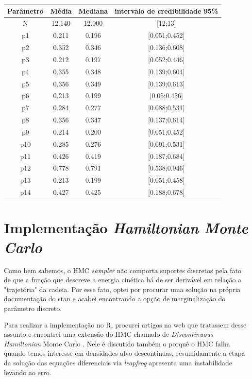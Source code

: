 \documentclass[a4paper,12pt,twoside]{article}
\begin{document}
\begin{table}[ht]
\centering
\begin{tabular}{cccc}
  \hline
  Parâmetro & Média & Mediana & intervalo de credibilidade 95\% \\ 
  \hline
 N & 12.140 & 12.000 & [12;13] \\ 
p1 & 0.211 & 0.196 & [0.051;0.452] \\ 
p2 & 0.352 & 0.346 & [0.136;0.608] \\ 
p3 & 0.212 & 0.197 & [0.052;0.446] \\ 
 p4 & 0.355 & 0.348 & [0.139;0.604] \\ 
 p5 & 0.356 & 0.349 & [0.139;0.613] \\ 
 p6 & 0.213 & 0.199 & [0.05;0.456] \\ 
 p7 & 0.284 & 0.277 & [0.088;0.531] \\ 
 p8 & 0.356 & 0.347 & [0.137;0.614] \\ 
 p9 & 0.214 & 0.200 & [0.051;0.452] \\ 
p10 & 0.285 & 0.276 & [0.091;0.531] \\ 
 p11 & 0.426 & 0.419 & [0.187;0.684] \\ 
 p12 & 0.778 & 0.791 & [0.538;0.946] \\ 
p13 & 0.213 & 0.199 & [0.051;0.458] \\ 
 p14 & 0.427 & 0.425 & [0.188;0.678] \\ 
   \hline
\end{tabular}
\end{table}

\newpage
\section{Implementação \textit{Hamiltonian Monte Carlo}}
Como bem sabemos, o HMC \textit{sampler} não comporta suportes discretos pela fato de que a função que descreve a energia cinética há de ser derivável em relação a "trajetória" da cadeia. Por esse fato, optei por procurar uma solução na própria documentação do stan e acabei encontrando a opção de marginalização do parâmetro discreto.

Para realizar a implementação no R, procurei artigos na web que tratassem desse assunto e encontrei uma extensão do HMC chamado de \textit{Discontinuous Hamiltonian} Monte Carlo \cite{dhmc}. Nele é discutido também o porquê o HMC falha quando temos interesse em densidades alvo descontínuas, resumidamente a etapa da solução das equações diferenciais via \textit{leapfrog} apresenta uma instabilidade levando ao erro.
\end{document}
